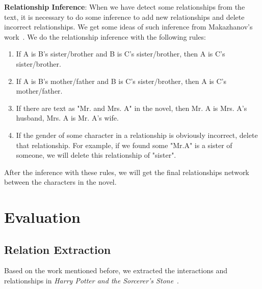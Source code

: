 \documentclass[11pt]{article}
\begin{document}
{\bf Relationship Inference}: When we have detect some relationships from the text, it is necessary to do some inference to add new relationships and delete incorrect relationships. We get some ideas of such inference from Makazhanov’s work~\cite{Makazhanov2014ExtractingFR}. We do the relationship inference with the following rules:
\begin{enumerate}
    \item If A is B's sister/brother and B is C's sister/brother, then A is C's sister/brother.
    \item If A is B's mother/father and B is C's sister/brother, then A is C's mother/father.
    \item If there are text as "Mr. and Mrs. A" in the novel, then Mr. A is Mrs. A's husband, Mrs. A is Mr. A's wife.
    \item If the gender of some character in a relationship is obviously incorrect, delete that relationship. For example, if we found some "Mr.A" is a sister of someone, we will delete this relationship of "sister".
\end{enumerate}

After the inference with these rules, we will get the final relationships network between the characters in the novel.




\section{Evaluation} %
\subsection{Relation Extraction}
    Based on the work mentioned before, we extracted the interactions and relationships in \textit{Harry Potter and the Sorcerer's Stone}~\cite{harrypotter}.
    
\end{document}
